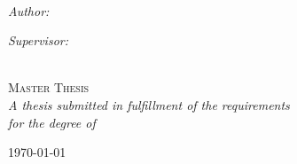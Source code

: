 \begin{titlepage}
    \begin{center}
    
        \vspace*{.06\textheight}
        
        {\scshape\LARGE \univname\par}\vspace{1.5cm} %
        
        {\huge \bfseries \ttitle\par}\vspace{0.4cm} %
        
        \HRule \\[0.4cm] %
        
        \begin{minipage}[t]{0.4\textwidth}
            \begin{flushleft} \large
                \emph{Author:}\\
                \authorname %
            \end{flushleft}
        \end{minipage}
        \begin{minipage}[t]{0.4\textwidth}
            \begin{flushright} \large
                \emph{Supervisor:} \\
                \supname %
            \end{flushright}
        \end{minipage}\\[3cm]
        
        \vfill
        \textsc{\Large Master Thesis}\\[0.5cm] %
        
        \vfill
        \large \textit{A thesis submitted in fulfillment of the requirements\\ for the degree of \degreename}\\[0.3cm] %
        
        \begin{minipage}[b]{\textwidth}
            \centering
            \onehalfspacing
            \large   
            \today
            \vspace{-20mm} 
        \end{minipage}%
    \end{center}
\end{titlepage}